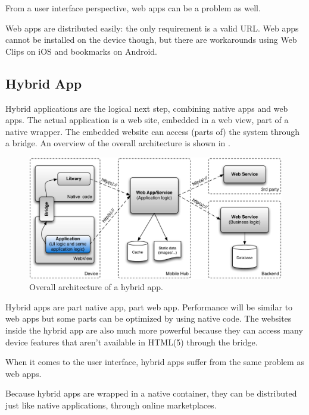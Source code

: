 From a user interface perspective, web apps can be a problem as well. 

Web apps are distributed easily: the only requirement is a valid URL. Web apps cannot be installed on the device though, but there are workarounds using Web Clips on iOS \cite{Safari:webclips} and bookmarks on Android. 

\subsection{Hybrid App}

Hybrid applications are the logical next step, combining native apps and web apps. The actual application is a web site, embedded in a web view, part of a native wrapper. The embedded website can access (parts of) the system through a bridge. An overview of the overall architecture is shown in . 

\begin{figure}[h!]
    \begin{center}
        \includegraphics[width=\textwidth]{figs/hybrid.pdf}
        \caption{
            Overall architecture of a hybrid app.
        }
        \label{fig:hybrid}
    \end{center}
\end{figure}

Hybrid apps are part native app, part web app. Performance will be similar to web apps but some parts can be optimized by using native code. The websites inside the hybrid app are also much more powerful because they can access many device features that aren't available in HTML(5) through the bridge.

When it comes to the user interface, hybrid apps suffer from the same problem as web apps. 

Because hybrid apps are wrapped in a native container, they can be distributed just like native applications, through online marketplaces. 

